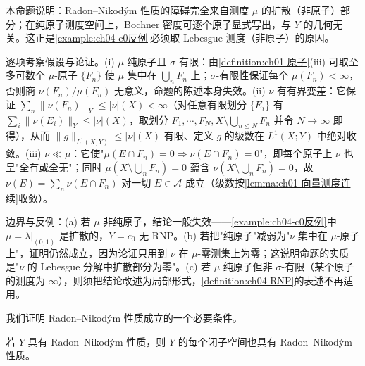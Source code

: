 \documentclass[../../main.tex]{subfiles}%
\begin{document}
\begin{remark}\label{remark:ch04-纯原子RNP}
本命题说明：Radon--Nikodým 性质的障碍完全来自测度 $\mu$ 的扩散（非原子）部分；在纯原子测度空间上，Bochner 密度可逐个原子显式写出，与 $Y$ 的几何无关。这正是\cref{example:ch04-c0反例}必须取 Lebesgue 测度（非原子）的原因。

逐项考察假设与论证。(i) $\mu$ 纯原子且 $\sigma$-有限：由\cref{definition:ch01-原子}(iii) 可取至多可数个 $\mu$-原子 $\{F_n\}$ 使 $\mu$ 集中在 $\bigcup_nF_n$ 上；$\sigma$-有限性保证每个 $\mu(F_n)<\infty$，否则商 $\nu(F_n)/\mu(F_n)$ 无意义，命题的陈述本身失效。(ii) $\nu$ 有有界变差：它保证 $\sum_n\|\nu(F_n)\|_Y\leqslant|\nu|(X)<\infty$（对任意有限划分 $\{E_i\}$ 有 $\sum_i\|\nu(E_i)\|_Y\leqslant|\nu|(X)$，取划分 $F_1,\cdots,F_N,X\setminus\bigcup_{n\leqslant N}F_n$ 并令 $N\to\infty$ 即得），从而 $\|g\|_{L^1(X;Y)}\leqslant|\nu|(X)$ 有限、定义 $g$ 的级数在 $L^1(X;Y)$ 中绝对收敛。(iii) $\nu\ll\mu$：它使"$\mu(E\cap F_n)=0\Rightarrow\nu(E\cap F_n)=0$"，即每个原子上 $\nu$ 也呈"全有或全无"；同时 $\mu(X\setminus\bigcup_nF_n)=0$ 蕴含 $\nu(X\setminus\bigcup_nF_n)=0$，故 $\nu(E)=\sum_n\nu(E\cap F_n)$ 对一切 $E\in\mathcal{A}$ 成立（级数按\cref{lemma:ch01-向量测度连续}收敛）。

边界与反例：(a) 若 $\mu$ 非纯原子，结论一般失效——\cref{example:ch04-c0反例}中 $\mu=\lambda|_{(0,1)}$ 是扩散的，$Y=c_0$ 无 RNP。(b) 若把"纯原子"减弱为"$\nu$ 集中在 $\mu$-原子上"，证明仍然成立，因为论证只用到 $\nu$ 在 $\mu$-零测集上为零；这说明命题的实质是"$\nu$ 的 Lebesgue 分解中扩散部分为零"。(c) 若 $\mu$ 纯原子但非 $\sigma$-有限（某个原子的测度为 $\infty$），则须把结论改述为局部形式，\cref{definition:ch04-RNP}的表述不再适用。
\end{remark}

我们证明 Radon--Nikodým 性质成立的一个必要条件。

\begin{proposition}\label{proposition:ch04-RNP子空间}
若 $Y$ 具有 Radon--Nikodým 性质，则 $Y$ 的每个闭子空间也具有 Radon--Nikodým 性质。
\end{proposition}
\end{document}
